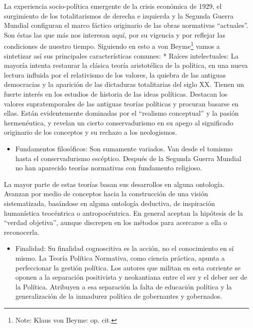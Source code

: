 \documentclass[
]{book}
\providecommand{\tightlist}{%
  \setlength{\itemsep}{0pt}\setlength{\parskip}{0pt}}
\begin{document}
La experiencia socio-política emergente de la crisis económica de 1929, el surgimiento de los totalitarismos de derecha e izquierda y la Segunda Guerra Mundial configuran el marco fáctico originario de las obras normativas ``actuales''. Son éstas las que más nos interesan aquí, por su vigencia y por reflejar las condiciones de nuestro tiempo. Siguiendo en esto a von Beyme\footnote{Note: Klaus von Beyme: op. cit.} vamos a sintetizar así sus principales características comunes: * Raíces intelectuales: La mayoría intenta restaurar la clásica teoría aristotélica de la política, en una nueva lectura influida por el relativismo de los valores, la quiebra de las antiguas democracias y la aparición de las dictaduras totalitarias del siglo XX. Tienen un fuerte interés en los estudios de historia de las ideas políticas. Destacan los valores supratemporales de las antiguas teorías políticas y procuran basarse en ellas. Están evidentemente dominadas por el ``realismo conceptual'' y la pasión hermenéutica, y revelan un cierto conservadurismo en su apego al significado originario de los conceptos y su rechazo a los neologismos.

\begin{itemize}
\tightlist
\item
  Fundamentos filosóficos: Son sumamente variados. Van desde el tomismo hasta el conservadurismo escéptico. Después de la Segunda Guerra Mundial no han aparecido teorías normativas con fundamento religioso.
\end{itemize}

La mayor parte de estas teorías basan sus desarrollos en alguna ontología. Avanzan por medio de conceptos hacia la construcción de una visión sistematizada, basándose en alguna ontología deductiva, de inspiración humanística teocéntrica o antropocéntrica. En general aceptan la hipótesis de la ``verdad objetiva'', aunque discrepen en los métodos para acercarse a ella o reconocerla.

\begin{itemize}
\tightlist
\item
  Finalidad: Su finalidad cognoscitiva es la acción, no el conocimiento en sí mismo. La Teoría Política Normativa, como ciencia práctica, apunta a perfeccionar la gestión política. Los autores que militan en esta corriente se oponen a la separación positivista y neokantiana entre el ser y el deber ser de la Política. Atribuyen a esa separación la falta de educación política y la generalización de la inmadurez política de gobernantes y gobernados.
\end{itemize}
\end{document}
